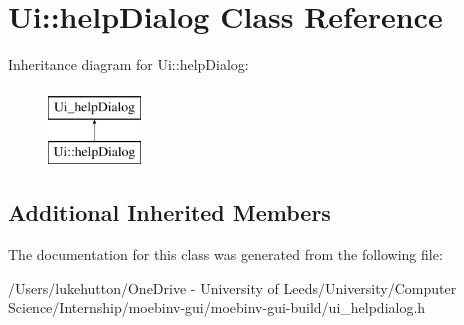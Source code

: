 \hypertarget{class_ui_1_1help_dialog}{}\section{Ui\+:\+:help\+Dialog Class Reference}
\label{class_ui_1_1help_dialog}
Inheritance diagram for Ui\+:\+:help\+Dialog\+:\begin{figure}[H]
\begin{center}
\leavevmode
\includegraphics[height=2.000000cm]{class_ui_1_1help_dialog}
\end{center}
\end{figure}
\subsection*{Additional Inherited Members}


The documentation for this class was generated from the following file\+:\begin{DoxyCompactItemize}
\item 
/\+Users/lukehutton/\+One\+Drive -\/ University of Leeds/\+University/\+Computer Science/\+Internship/moebinv-\/gui/moebinv-\/gui-\/build/ui\+\_\+helpdialog.\+h\end{DoxyCompactItemize}
